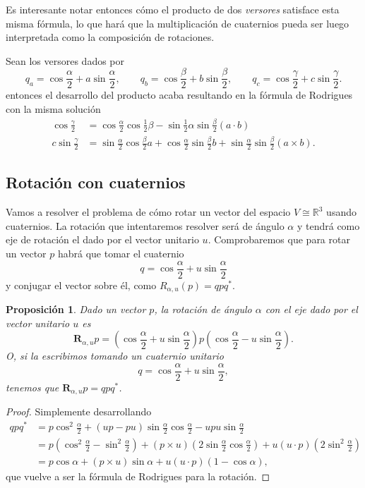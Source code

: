 \documentclass{article}
\theoremstyle{plain}
\newtheorem{proposition}{Proposición}
\theoremstyle{definition}
\theoremstyle{remark}
\begin{document}
Es interesante notar entonces cómo el producto de dos \textit{versores}
satisface esta misma fórmula, lo que hará que la multiplicación de
cuaternios pueda ser luego interpretada como la composición de
rotaciones.

Sean los versores dados por
\[
  q_a = \cos \frac{\alpha}{2}  + a \sin \frac{\alpha}{2} ,
  \qquad
  q_b = \cos \frac{\beta}{2} + b \sin \frac{\beta}{2},
  \qquad
  q_c = \cos \frac{\gamma}{2}  + c \sin \frac{\gamma}{2} .
\]
entonces el desarrollo del producto acaba resultando en la fórmula de
Rodrigues con la misma solución
\[\begin{aligned}
    \cos \frac{\gamma}{2} &=
    \cos \frac{\alpha}{2} \cos\frac{1}{2}\beta - \sin\frac{1}{2}\alpha\sin\frac{\beta}{2} (a\cdot b)\\
    c\sin \frac{\gamma}{2} &=
    \sin \frac{\alpha}{2} \cos\frac{\beta}{2} a +
    \cos \frac{\alpha}{2} \sin\frac{\beta}{2} b +
    \sin \frac{\alpha}{2} \sin\frac{\beta}{2} (a \times b).
  \end{aligned}\]

\subsection{Rotación con cuaternios}
Vamos a resolver el problema de cómo rotar un vector del espacio
$V \cong \mathbb{R}^3$ usando cuaternios. La rotación que intentaremos
resolver será de ángulo $\alpha$ y tendrá como eje de rotación el dado
por el vector unitario $u$. Comprobaremos que para rotar un vector $p$
habrá que tomar el cuaternio
\[q = \cos \frac{\alpha}{2} + u \sin \frac{\alpha}{2}\]
y conjugar el vector sobre él, como $R_{\alpha,u}(p) = qpq^\ast $.

\begin{proposition}
Dado un vector $p$, la rotación de ángulo $\alpha$ con el eje dado por
el vector unitario $u$ es
\[ \mathbf{R}_{\alpha,u}p =
  \left(\cos \frac{\alpha}{2} + u \sin \frac{\alpha}{2}\right)
  p
  \left(\cos \frac{\alpha}{2} - u \sin \frac{\alpha}{2}\right).\]
O, si la escribimos tomando un cuaternio unitario
\[
  q = \cos \frac{\alpha}{2} + u \sin \frac{\alpha}{2},
\]
tenemos que $\mathbf{R}_{\alpha,u}p = qpq^\ast $.
\end{proposition}
\begin{proof}
  Simplemente desarrollando
  \[\begin{aligned}
      qpq^\ast &=
      p \cos^2\frac{\alpha}{2} + (up-pu)\sin\frac{\alpha}{2}\cos\frac{\alpha}{2} - upu\sin\frac{\alpha}{2}
      \\&=
      p \left(\cos^2\frac{\alpha}{2} - \sin^2\frac{\alpha}{2} \right) +
      (p \times u)\left(2\sin\frac{\alpha}{2}\cos\frac{\alpha}{2}\right) +
      u(u\cdot p)\left(2\sin^2\frac{\alpha}{2}\right)
      \\&=
      p \cos\alpha +
      (p \times u)\sin\alpha +
      u(u\cdot p)\left(1 - \cos \alpha\right),
    \end{aligned}\]
  que vuelve a ser la fórmula de Rodrigues para la rotación.
\end{proof}
\end{document}
